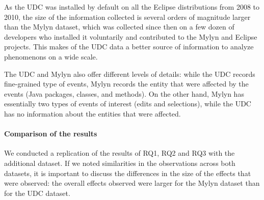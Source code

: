 \documentclass[times]{smrauth}
\begin{document}
As the UDC was installed by default on all the Eclipse distributions from 2008 to 2010, the size of the information collected is several orders of magnitude larger than the Mylyn dataset, which was collected since then on a few dozen of developers who installed it voluntarily and contributed to the Mylyn and Eclipse projects. This makes of the UDC data a better source of information to analyze phenomenons on a wide scale.

The UDC and Mylyn also offer different levels of details: while the UDC records fine-grained type of events, Mylyn records the entity that were affected by the events (Java packages, classes, and methods). On the other hand, Mylyn has essentially two types of events of interest (edits and selections), while the UDC has no information about the entities that were affected.






\paragraph{Comparison of the results}

We conducted a replication of the results of RQ1, RQ2 and RQ3 with the additional dataset. If we noted similarities in the observations across both datasets, it is important to discuss the differences in the size of the effects that were observed: the overall effects observed were larger for the Mylyn dataset than for the UDC dataset.
\end{document}
